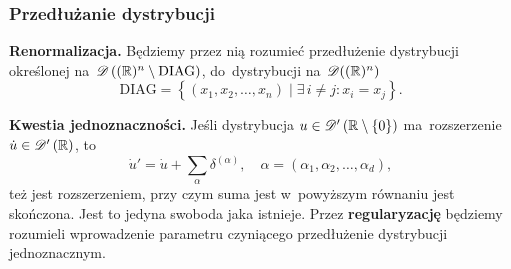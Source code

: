 \documentclass[10pt,t]{beamer}
\newcommand{\DIAG}{\textrm{DIAG}}
\begin{document}
\begin{frame}
  \frametitle{Przedłużanie dystrybucji}


  \textbf{Renormalizacja.} Będziemy przez nią rozumieć przedłużenie
  dystrybucji określonej na~$\Dcal\left( ( \Rbb )^{ n } \setminus \DIAG \right)$,
  do~dystrybucji na~$\mathcal{D}( ( \mathbb{R} )^{ n } )$
  \begin{equation}
    \label{eq:Epstein-Glaser-02}
    \DIAG =
    \left\{ ( x_{ 1 }, x_{ 2 }, \ldots, x_{ n } ) \; | \;
      \exists\, i \neq j : x_{ i } = x_{ j } \right\}.
  \end{equation}

  \vspace{\spaceFour}



  \textbf{Kwestia jednoznaczności.}
  Jeśli dystrybucja $u \in \mathcal{D}'\left( \mathbb{R} \setminus \{ 0 \} \right)$ ma~rozszerzenie
  $\dot{ u } \in \mathcal{D}'\left( \mathbb{R} \right)$, to
  \begin{equation}
    \label{eq:Epstein-Glaser-03}
    \dot{ u }' = \dot{ u } + \sum_{ \alpha } \delta^{ ( \alpha ) }, \quad
    \alpha = ( \alpha_{ 1 }, \alpha_{ 2 }, \ldots, \alpha_{ d } ),
  \end{equation}
  też jest rozszerzeniem, przy czym suma jest w~powyższym równaniu
  jest skończona. Jest to jedyna swoboda jaka istnieje. Przez
  \textbf{regularyzację} będziemy rozumieli wprowadzenie parametru
  czyniącego przedłużenie dystrybucji jednoznacznym.

\end{frame}
\end{document}

